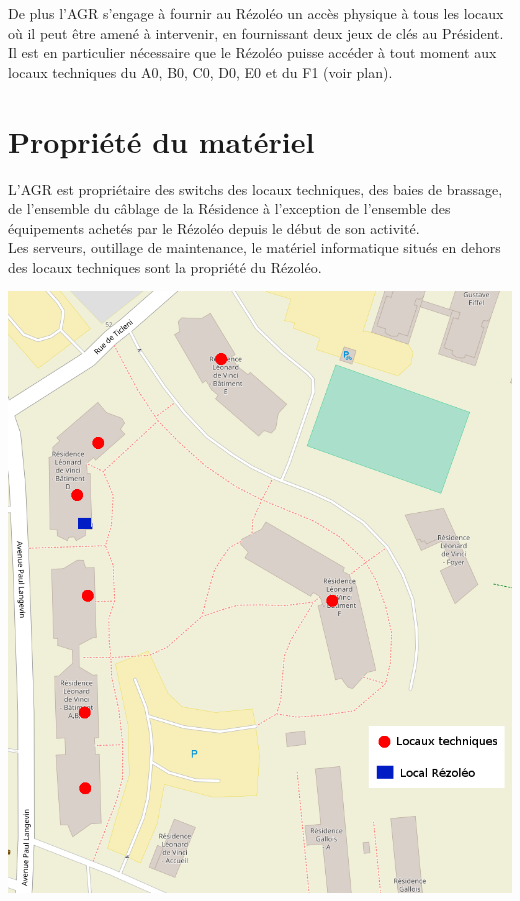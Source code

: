 \documentclass[12pt]{constitution}
\begin{document}
    De plus l'AGR s'engage à fournir au Rézoléo un accès physique à tous les locaux où il peut être amené à intervenir, en fournissant deux jeux de clés au Président.\\

    Il est en particulier nécessaire que le Rézoléo puisse accéder à tout moment aux locaux techniques du A0, B0, C0, D0, E0 et du F1 (voir plan).\\

\section{Propriété du matériel}

    L'AGR est propriétaire des switchs des locaux techniques, des baies de brassage, de l'ensemble du câblage de la Résidence à l'exception de l'ensemble des équipements achetés par le Rézoléo depuis le début de son activité.\\

    Les serveurs, outillage de maintenance, le matériel informatique situés en dehors des locaux techniques sont la propriété du Rézoléo.

    \newpage

    \includegraphics[scale=0.6]{carteLocaux.png}
\end{document}
